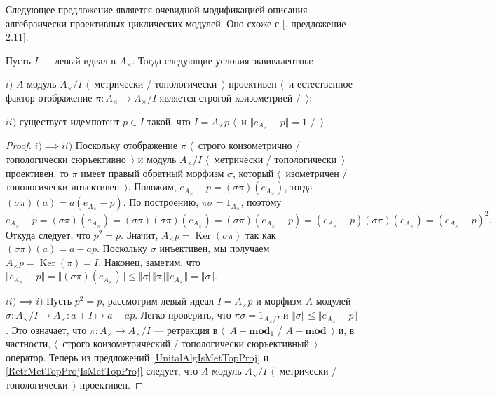Следующее предложение является очевидной модификацией описания алгебраически проективных циклических модулей. Оно схоже с [\cite{WhiteInjmoduAlg}, предложение 2.11].

\begin{proposition}\label{MetTopProjCycModCharac} Пусть $I$ --- левый идеал в $A_\times $. Тогда следующие условия эквивалентны:

$i)$ $A$-модуль $A_\times /I$ $\langle$~метрически / топологически~$\rangle$ проективен $\langle$~и естественное фактор-отображение $\pi:A_\times \to A_\times /I$ является строгой коизометрией /~$\rangle$;

$ii)$ существует идемпотент $p\in I$ такой, что $I=A_\times  p$ $\langle$~и $\Vert e_{A_\times }-p\Vert= 1$ /~$\rangle$
\end{proposition}
\begin{proof} $i)$$\implies$$ii)$ Поскольку отображение $\pi$ $\langle$~строго коизометрично / топологически сюръективно~$\rangle$ и модуль $A_\times /I$ $\langle$~метрически / топологически~$\rangle$ проективен, то $\pi$ имеет правый обратный морфизм $\sigma$, который $\langle$~изометричен / топологически инъективен~$\rangle$. Положим, $e_{A_\times }-p=(\sigma\pi)(e_{A_\times })$, тогда $(\sigma\pi)(a)=a(e_{A_\times }-p)$. По построению, $\pi\sigma=1_{A_\times }$, поэтому  
$$
e_{A_\times }-p=(\sigma\pi)(e_{A_\times })=(\sigma\pi)(\sigma\pi)(e_{A_\times })=(\sigma\pi)(e_{A_\times }-p)=(e_{A_\times }-p)(\sigma\pi)(e_{A_\times })=(e_{A_\times }-p)^2.
$$
Откуда следует, что $p^2=p$. Значит, $A_\times p=\operatorname{Ker}(\sigma\pi)$ так как $(\sigma\pi)(a)=a-ap$. Поскольку $\sigma$ инъективен, мы получаем $A_\times p=\operatorname{Ker}(\pi)=I$. Наконец, заметим, что $\Vert e_{A_\times }-p\Vert=\Vert(\sigma\pi)(e_{A_\times})\Vert\leq\Vert\sigma\Vert\Vert\pi\Vert\Vert e_{A_\times }\Vert=\Vert\sigma\Vert$.

$ii)$$\implies$$ i)$ Пусть $p^2=p$, рассмотрим левый идеал $I=A_\times p$ и морфизм $A$-модулей $\sigma:A_\times /I\to A_\times:a+I\mapsto a-ap$. Легко проверить, что $\pi\sigma=1_{A_\times/I}$ и $\Vert\sigma\Vert\leq\Vert e_{A_\times }-p\Vert$. Это означает, что $\pi:A_\times \to A_\times /I$ --- ретракция в $\langle$~$A-\mathbf{mod}_1$ / $A-\mathbf{mod}$~$\rangle$ и, в частности, $\langle$~строго коизометрический / топологически сюръективный~$\rangle$ оператор. Теперь из предложений \ref{UnitalAlgIsMetTopProj} и \ref{RetrMetTopProjIsMetTopProj} следует, что $A$-модуль $A_\times /I$ $\langle$~метрически / топологически~$\rangle$ проективен.
\end{proof} 

